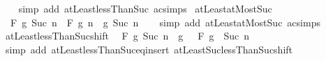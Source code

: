 \begin{isabellebody}
%
\isadelimproof
\ \ %
\endisadelimproof
%
\isatagproof
{}\isamarkupfalse%
\ {\isacharparenleft}{\kern0pt}simp\ add{\isacharcolon}{\kern0pt}\ atLeast{}{\isacharunderscore}{\kern0pt}lessThan{\isacharunderscore}{\kern0pt}Suc\ ac{\isacharunderscore}{\kern0pt}simps{\isacharparenright}{\kern0pt}%
\endisatagproof
{\isafoldproof}%
%
\isadelimproof
\isanewline
%
\endisadelimproof
\isanewline
{}\isamarkupfalse%
\ atLeast{}{\isacharunderscore}{\kern0pt}atMost{\isacharunderscore}{\kern0pt}Suc{\isacharcolon}{\kern0pt}\isanewline
\ \ {\isachardoublequoteopen}F\ g\ {\isacharbraceleft}{\kern0pt}{}{\isachardot}{\kern0pt}{\isachardot}{\kern0pt}Suc\ n{\isacharbraceright}{\kern0pt}\ {\isacharequal}{\kern0pt}\ F\ g\ {\isacharbraceleft}{\kern0pt}{}{\isachardot}{\kern0pt}{\isachardot}{\kern0pt}n{\isacharbraceright}{\kern0pt}\ \isactrlbold {\isacharasterisk}{\kern0pt}\ g\ {\isacharparenleft}{\kern0pt}Suc\ n{\isacharparenright}{\kern0pt}{\isachardoublequoteclose}\isanewline
%
\isadelimproof
\ \ %
\endisadelimproof
%
\isatagproof
{}\isamarkupfalse%
\ {\isacharparenleft}{\kern0pt}simp\ add{\isacharcolon}{\kern0pt}\ atLeast{}{\isacharunderscore}{\kern0pt}atMost{\isacharunderscore}{\kern0pt}Suc\ ac{\isacharunderscore}{\kern0pt}simps{\isacharparenright}{\kern0pt}%
\endisatagproof
{\isafoldproof}%
%
\isadelimproof
\isanewline
%
\endisadelimproof
\isanewline
{}\isamarkupfalse%
\ atLeast{}{\isacharunderscore}{\kern0pt}lessThan{\isacharunderscore}{\kern0pt}Suc{\isacharunderscore}{\kern0pt}shift{\isacharcolon}{\kern0pt}\isanewline
\ \ {\isachardoublequoteopen}F\ g\ {\isacharbraceleft}{\kern0pt}{}{\isachardot}{\kern0pt}{\isachardot}{\kern0pt}{\isacharless}{\kern0pt}Suc\ n{\isacharbraceright}{\kern0pt}\ {\isacharequal}{\kern0pt}\ g\ {}\ \isactrlbold {\isacharasterisk}{\kern0pt}\ F\ {\isacharparenleft}{\kern0pt}g\ {\isasymcirc}\ Suc{\isacharparenright}{\kern0pt}\ {\isacharbraceleft}{\kern0pt}{}{\isachardot}{\kern0pt}{\isachardot}{\kern0pt}{\isacharless}{\kern0pt}n{\isacharbraceright}{\kern0pt}{\isachardoublequoteclose}\isanewline
%
\isadelimproof
\ \ %
\endisadelimproof
%
\isatagproof
{}\isamarkupfalse%
\ {\isacharparenleft}{\kern0pt}simp\ add{\isacharcolon}{\kern0pt}\ atLeast{}{\isacharunderscore}{\kern0pt}lessThan{\isacharunderscore}{\kern0pt}Suc{\isacharunderscore}{\kern0pt}eq{\isacharunderscore}{\kern0pt}insert{\isacharunderscore}{\kern0pt}{}\ atLeast{\isacharunderscore}{\kern0pt}Suc{\isacharunderscore}{\kern0pt}lessThan{\isacharunderscore}{\kern0pt}Suc{\isacharunderscore}{\kern0pt}shift{\isacharparenright}{\kern0pt}%

\end{isabellebody}
